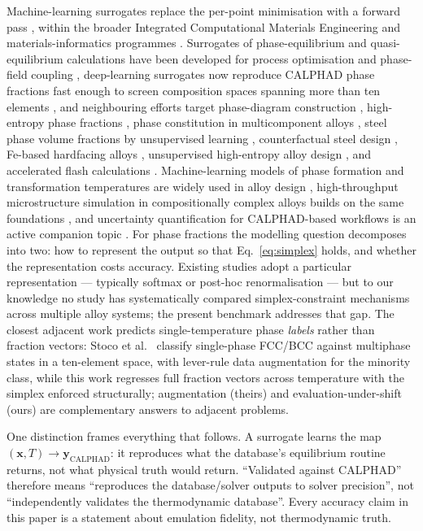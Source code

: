 \documentclass[preprint,12pt,authoryear]{elsarticle}
\begin{document}
Machine-learning surrogates replace the per-point minimisation with a forward
pass \citep{hart2021fast}, within the broader Integrated Computational
Materials Engineering and materials-informatics programmes
\citep{wang2019icme,panchal2013key,agrawal2016perspective,ward2017review}.
Surrogates of phase-equilibrium and
quasi-equilibrium calculations have been developed for process optimisation
and phase-field coupling \citep{nentwich2019surrogate,jiang2019fast,eiken2006multiphase},
deep-learning surrogates now reproduce CALPHAD phase fractions fast enough
to screen composition spaces spanning more than ten elements
\citep{tahkola2026accelerated}, and neighbouring efforts target
phase-diagram construction \citep{xi2025phasediagram}, high-entropy phase
fractions \citep{liu2024hea}, phase constitution in multicomponent alloys
\citep{vazquez2023dnn}, steel phase volume fractions by unsupervised
learning \citep{kim2021phasevol}, counterfactual steel design
\citep{xie2026knowledge}, Fe-based hardfacing alloys \citep{yu2026hardfacing},
unsupervised high-entropy alloy design \citep{lis2026unsupervised}, and
accelerated flash calculations \citep{zhang2020flash}.
Machine-learning models of phase formation
and transformation temperatures are widely used in alloy design
\citep{feng2021general,lu2024classified}, high-throughput microstructure
simulation in compositionally complex alloys builds on the same foundations
\citep{liy2021micro}, and uncertainty quantification for
CALPHAD-based workflows is an active companion topic
\citep{wang2020uncertainty}. For phase fractions the modelling question
decomposes into two: how to represent the output so that
Eq.~\eqref{eq:simplex} holds, and whether the representation costs accuracy.
Existing studies adopt a particular representation --- typically softmax or
post-hoc renormalisation --- but to our knowledge no study has systematically
compared simplex-constraint mechanisms across multiple alloy systems; the
present benchmark addresses that gap. The closest adjacent work predicts
single-temperature phase \emph{labels} rather than fraction vectors:
Stoco et al.\ \citep{stoco2026augment} classify single-phase FCC/BCC
against multiphase states in a ten-element space, with lever-rule data
augmentation for the minority class, while this work regresses full
fraction vectors across temperature with the simplex enforced
structurally; augmentation (theirs) and evaluation-under-shift (ours)
are complementary answers to adjacent problems.

One distinction frames everything that follows. A surrogate learns the map
$(\mathbf{x}, T) \to \mathbf{y}_{\mathrm{CALPHAD}}$: it reproduces what the
database's equilibrium routine returns, not what physical truth would
return. ``Validated against CALPHAD'' therefore means ``reproduces the
database/solver outputs to solver precision'', not ``independently
validates the thermodynamic database''. Every accuracy claim in this paper
is a statement about emulation fidelity, not thermodynamic truth.
\end{document}
